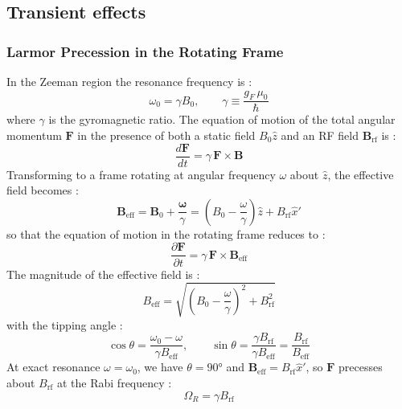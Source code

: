 \subsection{Transient effects}

\label{sec:transient}
 
\subsubsection*{Larmor Precession in the Rotating Frame}
 
In the Zeeman region the resonance frequency is :
\begin{equation}
    \omega_0 = \gamma B_0, \qquad \gamma \equiv \frac{g_F\,\mu_0}{\hbar}
    \label{eq:larmor}
\end{equation}
where $\gamma$ is the gyromagnetic ratio. The equation of motion of the total angular
momentum $\mathbf{F}$ in the presence of both a static field $B_0\hat{z}$ and an RF
field $\mathbf{B}_{\text{rf}}$ is :
\begin{equation}
    \frac{d\mathbf{F}}{dt} = \gamma\,\mathbf{F} \times \mathbf{B}
    \label{eq:eom}
\end{equation}
Transforming to a frame rotating at angular frequency $\omega$ about $\hat{z}$, the
effective field becomes :
\begin{equation}
    \mathbf{B}_{\text{eff}} = \mathbf{B}_0 + \frac{\boldsymbol{\omega}}{\gamma}
    = \left(B_0 - \frac{\omega}{\gamma}\right)\hat{z} + B_{\text{rf}}\hat{x}'
    \label{eq:Beff}
\end{equation}
so that the equation of motion in the rotating frame reduces to :
\begin{equation}
    \frac{\partial \mathbf{F}}{\partial t} = \gamma\,\mathbf{F} \times \mathbf{B}_{\text{eff}}
    \label{eq:eom_rot}
\end{equation}
The magnitude of the effective field is :
\begin{equation}
    B_{\text{eff}} = \sqrt{\left(B_0 - \frac{\omega}{\gamma}\right)^2 + B_{\text{rf}}^2}
    \label{eq:Beff_mag}
\end{equation}
with the tipping angle :
\begin{equation}
    \cos\theta = \frac{\omega_0 - \omega}{\gamma B_{\text{eff}}},
    \qquad
    \sin\theta = \frac{\gamma B_{\text{rf}}}{\gamma B_{\text{eff}}} = \frac{B_{\text{rf}}}{B_{\text{eff}}}
    \label{eq:theta}
\end{equation}
At exact resonance $\omega = \omega_0$, we have $\theta = 90°$ and
$\mathbf{B}_{\text{eff}} = B_{\text{rf}}\hat{x}'$, so $\mathbf{F}$ precesses about
$B_{\text{rf}}$ at the Rabi frequency :
\begin{equation}
    \Omega_R = \gamma B_{\text{rf}}
    \label{eq:rabi_freq}
\end{equation}
 
